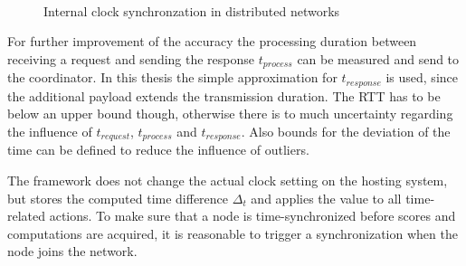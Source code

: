 \begin{figure}[!htb] %
	\centering
	\\
	\caption[Distributed clock synchronzation]{Internal clock synchronzation in distributed networks} \label{figure:Distributed clock synchronzation}
\end{figure}

For further improvement of the accuracy the processing duration between receiving a request and sending the response $t_{process}$ can be measured and send to the coordinator. In this thesis the simple approximation for $t_{response}$ is used, since the additional payload extends the transmission duration. The \gls{RTT} has to be below an upper bound though, otherwise there is to much uncertainty regarding the influence of $t_{request}$, $t_{process}$ and $t_{response}$.
Also bounds for the deviation of the time can be defined to reduce the influence of outliers.

The framework does not change the actual clock setting on the hosting system, but stores the computed time difference $\Delta_t$ and applies the value to all time-related actions. To make sure that a node is time-synchronized before scores and computations are acquired, it is reasonable to trigger a synchronization when the node joins the network. 

